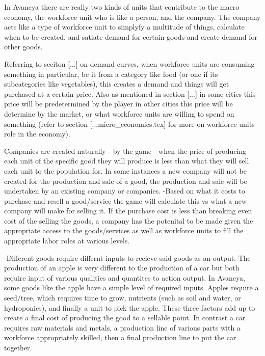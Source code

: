 


In Avaneya there are really two kinds of units that contribute to the macro economy, the workforce unit who is like a person, and the company. The company acts like a type of workforce unit to simplyfy a multitude of things, calculate when to be created, and satiate demand for certain goods and create demand for other goods. 


Referring to seciton [...] on demand curves, when workforce units are consuming something in particular, be it from a category like food (or one if its subcategories like vegetables), this creates a demand and things will get purchased at a certain price. Also as mentioned in section [...] in some cities this price will be predetermined by the player in other cities this price will be determine by the market, or what workforce units are willing to spend on something (refer to section [...micro_economics.tex] for more on workforce units role in the economy).

Companies are created naturally - by the game - when the price of producing each unit of the specific good they will produce is less than what they will sell each unit to the population for. In some instances a new company will not be created for the production and sale of a good, the production and sale will be undertaken by an existing company or companies.
-Based on what it costs to purchase and resell a good/service the game will calculate this vs what a new company will make for selling it. If the purchase cost is less than breaking even cost of the selling the goods, a company has the potenital to be made given the appropriate access to the goods/services as well as workforce units to fill the appropriate labor roles at various levels.

-Different goods require differnt inputs to recieve said goods as an output. The production of an apple is very different to the production of a car but both require input of various qualities and quantites to action output. In Avaneya, some goods like the apple have a simple level of required inputs. Apples require a seed/tree, which requires time to grow, nutrients (such as soil and water, or hydroponics), and finally a unit to pick the apple. These three factors add up to create a final cost of producing the good to a sellable point. In contrast a car requires raw materials and metals, a production line of various parts with a workforce appropriately skilled, then a final production line to put the car together. 

